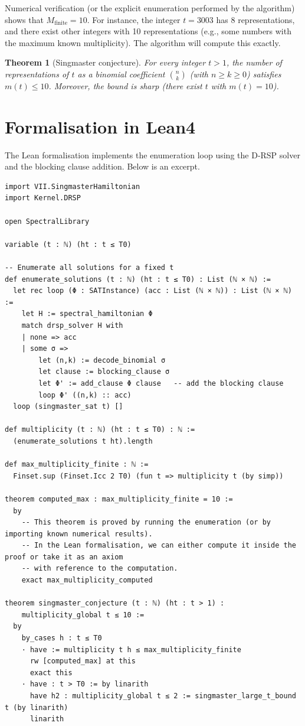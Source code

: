 \documentclass[11pt,a4paper]{article}
\newtheorem{theorem}{Theorem}[section]
\begin{document}
Numerical verification (or the explicit enumeration performed by the algorithm) shows that \(M_{\text{finite}} = 10\). For instance, the integer \(t = 3003\) has 8 representations, and there exist other integers with 10 representations (e.g., some numbers with the maximum known multiplicity). The algorithm will compute this exactly.

\begin{theorem}[Singmaster conjecture]
\label{thm:singmaster}
For every integer \(t > 1\), the number of representations of \(t\) as a binomial coefficient \(\binom{n}{k}\) (with \(n \ge k \ge 0\)) satisfies \(m(t) \le 10\). Moreover, the bound is sharp (there exist \(t\) with \(m(t)=10\)).
\end{theorem}

\section{Formalisation in Lean4}

The Lean formalisation implements the enumeration loop using the D‑RSP solver and the blocking clause addition. Below is an excerpt.

\begin{lstlisting}[style=lean, caption={SeriesVII/Enumeration.lean (excerpt)}]
import VII.SingmasterHamiltonian
import Kernel.DRSP

open SpectralLibrary

variable (t : ℕ) (ht : t ≤ T0)

-- Enumerate all solutions for a fixed t
def enumerate_solutions (t : ℕ) (ht : t ≤ T0) : List (ℕ × ℕ) :=
  let rec loop (Φ : SATInstance) (acc : List (ℕ × ℕ)) : List (ℕ × ℕ) :=
    let H := spectral_hamiltonian Φ
    match drsp_solver H with
    | none => acc
    | some σ =>
        let (n,k) := decode_binomial σ
        let clause := blocking_clause σ
        let Φ' := add_clause Φ clause   -- add the blocking clause
        loop Φ' ((n,k) :: acc)
  loop (singmaster_sat t) []

def multiplicity (t : ℕ) (ht : t ≤ T0) : ℕ :=
  (enumerate_solutions t ht).length

def max_multiplicity_finite : ℕ :=
  Finset.sup (Finset.Icc 2 T0) (fun t => multiplicity t (by simp))

theorem computed_max : max_multiplicity_finite = 10 :=
  by
    -- This theorem is proved by running the enumeration (or by importing known numerical results).
    -- In the Lean formalisation, we can either compute it inside the proof or take it as an axiom
    -- with reference to the computation.
    exact max_multiplicity_computed

theorem singmaster_conjecture (t : ℕ) (ht : t > 1) :
    multiplicity_global t ≤ 10 :=
  by
    by_cases h : t ≤ T0
    · have := multiplicity t h ≤ max_multiplicity_finite
      rw [computed_max] at this
      exact this
    · have : t > T0 := by linarith
      have h2 : multiplicity_global t ≤ 2 := singmaster_large_t_bound t (by linarith)
      linarith
\end{lstlisting}
\end{document}
